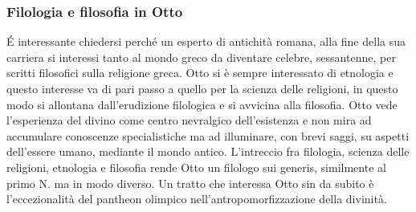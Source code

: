 \documentclass[10pt,a4paper]{article}
\begin{document}
\subsubsection{Filologia e filosofia in Otto}
\'E interessante chiedersi perché un esperto di antichità romana, alla fine della sua carriera si interessi tanto al mondo greco da diventare celebre, sessantenne, per scritti filosofici sulla religione greca. Otto si è sempre interessato di etnologia e questo interesse va di pari passo a quello per la scienza delle religioni, in questo modo si allontana dall'erudizione filologica e si avvicina alla filosofia. Otto vede l'esperienza del divino come centro nevralgico dell'esistenza e non mira ad accumulare conoscenze specialistiche ma ad illuminare, con brevi saggi, su aspetti dell'essere umano, mediante il mondo antico. L'intreccio fra filologia, scienza delle religioni, etnologia e filosofia rende Otto un filologo sui generis, similmente al primo N. ma in modo diverso. Un tratto che interessa Otto sin da subito è l'eccezionalità del pantheon olimpico nell'antropomorfizzazione della divinità.
\end{document}
